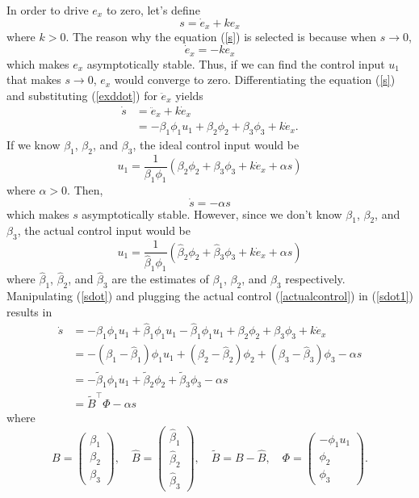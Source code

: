 In order to drive $e_x$ to zero, let's define
\begin{equation}
s=\dot{e}_x+ke_x
\label{s}
\end{equation} where $k>0$. The reason why the equation (\ref{s}) is selected is because when $s\rightarrow0$, 
\begin{equation}
\dot{e}_x=-ke_x
\end{equation} which makes $e_x$ asymptotically stable. Thus, if we can find the control input $u_1$ that makes $s\rightarrow0$, $e_x$ would converge to zero. Differentiating the equation (\ref{s}) and substituting (\ref{exddot}) for $\ddot{e}_x$ yields
\begin{align}
\dot{s}&=\ddot{e}_x+k\dot{e}_x
\\&=-\beta_1\phi_1u_1+\beta_2\phi_2+\beta_3\phi_3+k\dot{e}_x.
\label{sdot}
\end{align}
If we know $\beta_1$, $\beta_2$, and $\beta_3$, the ideal control input would be 
\begin{equation}
u_1=\frac{1}{\beta_1\phi_1}(\beta_2\phi_2+\beta_3\phi_3+k\dot{e}_x+\alpha s)
\end{equation}
where $\alpha>0$.
Then, 
\begin{equation}
\dot{s}=-\alpha s
\end{equation} 
which makes $s$ asymptotically stable. 
However, since we don't know $\beta_1$, $\beta_2$, and $\beta_3$, the actual control input would be 
\begin{equation}
u_1=\frac{1}{\hat{\beta}_1\phi_1}(\hat{\beta}_2\phi_2+\hat{\beta}_3\phi_3+k\dot{e}_x+\alpha s)
\label{actualcontrol}
\end{equation}
where $\hat{\beta}_1$, $\hat{\beta}_2$, and $\hat{\beta}_3$ are the estimates of $\beta_1$, $\beta_2$, and $\beta_3$ respectively. Manipulating (\ref{sdot}) and plugging the actual control (\ref{actualcontrol}) in (\ref{sdot1}) results in
\begin{align}
\dot{s}&=-\beta_1\phi_1u_1+\hat{\beta}_1\phi_1u_1-\hat{\beta}_1\phi_1u_1+\beta_2\phi_2+\beta_3\phi_3+k\dot{e}_x
\label{sdot1}
\\&=-(\beta_1-\hat{\beta}_1)\phi_1u_1+(\beta_2-\hat{\beta}_2)\phi_2+(\beta_3-\hat{\beta}_3)\phi_3-\alpha s
\\&=-\tilde{\beta}_1\phi_1u_1+\tilde{\beta}_2\phi_2+\tilde{\beta}_3\phi_3-\alpha s
\\&=\tilde{B}^\top\Phi-\alpha s
\label{sdot2}
\end{align}
where 
\begin{equation}
B=\begin{pmatrix}
\beta_1 \\ \beta_2 \\ \beta_3
\end{pmatrix}, \quad
\hat{B}=\begin{pmatrix} \hat{\beta}_1 \\ \hat{\beta}_2 \\ \hat{\beta}_3 \end{pmatrix}, \quad
\tilde{B}=B-\hat{B}, \quad 
\Phi=\begin{pmatrix} -\phi_1u_1 \\ \phi_2 \\ \phi_3 \end{pmatrix}.
\end{equation}
